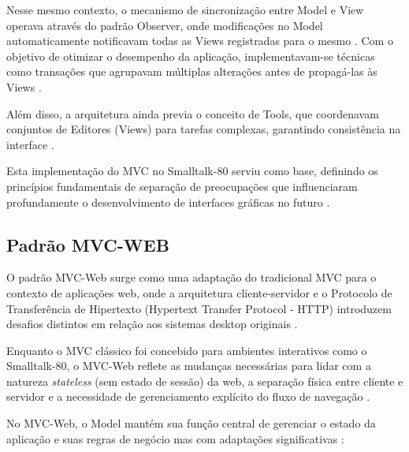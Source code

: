         \par Nesse mesmo contexto, o mecanismo de sincronização entre Model e View operava através do padrão Observer, onde modificações no Model automaticamente notificavam todas as Views registradas para o mesmo \cite{artigo:reenskaug:2003}. Com o objetivo de otimizar o desempenho da aplicação, implementavam-se técnicas como transações que agrupavam múltiplas alterações antes de propagá-las às Views \cite{artigo:reenskaug:2003}.
        
        \par Além disso, a arquitetura ainda previa o conceito de Tools, que coordenavam conjuntos de Editores (Views) para tarefas complexas, garantindo consistência na interface \cite{artigo:reenskaug:2003}. 
        
        \par Esta implementação do MVC no Smalltalk-80 serviu como base, definindo os princípios fundamentais de separação de preocupações que influenciaram profundamente o desenvolvimento de interfaces gráficas no futuro \cite{artigo:reenskaug:2003}.
            
    \subsection{Padrão MVC-WEB}
    
        \par O padrão MVC-Web surge como uma adaptação do tradicional MVC para o contexto de aplicações web, onde a arquitetura cliente-servidor e o Protocolo de Transferência de Hipertexto (Hypertext Transfer Protocol - HTTP) introduzem desafios distintos em relação aos sistemas desktop originais \cite{inproceedings:grove:2011}.
        
        \par Enquanto o MVC clássico foi concebido para ambientes interativos como o Smalltalk-80, o MVC-Web reflete as mudanças necessárias para lidar com a natureza \textit{stateless} (sem estado de sessão) da web, a separação física entre cliente e servidor e a necessidade de gerenciamento explícito do fluxo de navegação \cite{inproceedings:grove:2011}.
        
        
        \par No MVC-Web, o Model mantém sua função central de gerenciar o estado da aplicação e suas regras de negócio mas com adaptações significativas \cite{inproceedings:grove:2011}:
    
